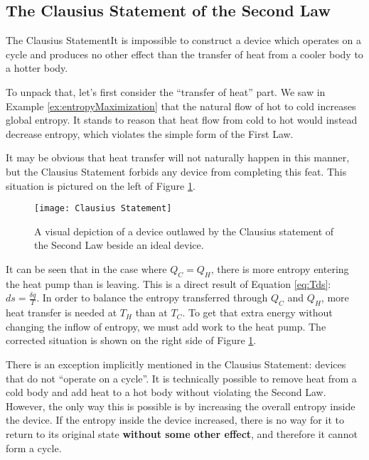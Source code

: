 \subsection{The Clausius Statement of the Second Law}
\begin{quoteWithTitle}{The Clausius Statement}{It is impossible to construct a device which operates on a cycle and produces no other effect than the transfer of heat from a cooler body to a hotter body.}
\end{quoteWithTitle}

To unpack that, let's first consider the ``transfer of heat'' part.  We saw in Example \ref{ex:entropyMaximization} that the natural flow of hot to cold increases global entropy.  It stands to reason that heat flow from cold to hot would instead decrease entropy, which violates the simple form of the First Law.

It may be obvious that heat transfer will not naturally happen in this manner, but the Clausius Statement forbids any device from completing this feat.  This situation is pictured on the left of Figure \ref{fig:clausiusViolator}.

\begin{figure}[H]
  \centering
  \texttt{[image: Clausius Statement]}
  \caption{A visual depiction of a device outlawed by the Clausius statement of the Second Law beside an ideal device.}
  \label{fig:clausiusViolator}
\end{figure}

It can be seen that in the case where $Q_C = Q_H$, there is more entropy entering the heat pump than is leaving.  This is a direct result of Equation \ref{eq:Tds}: $ds = \frac{\delta q}{T}$.  In order to balance the entropy transferred through $Q_C$ and $Q_H$, more heat transfer is needed at $T_H$ than at $T_C$.  To get that extra energy without changing the inflow of entropy, we must add work to the heat pump.  The corrected situation is shown on the right side of Figure \ref{fig:clausiusViolator}.

There is an exception implicitly mentioned in the Clausius Statement: devices that do not ``operate on a cycle''.  It is technically possible to remove heat from a cold body and add heat to a hot body without violating the Second Law.  However, the only way this is possible is by increasing the overall entropy inside the device.  If the entropy inside the device increased, there is no way for it to return to its original state {\bf without some other effect}, and therefore it cannot form a cycle.


